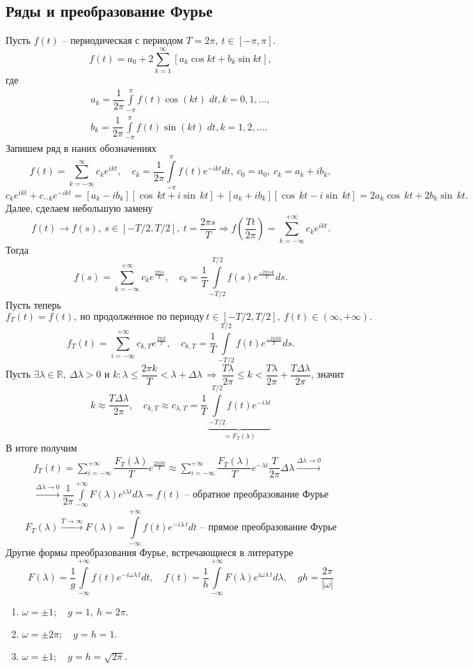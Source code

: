 \subsection{Ряды и преобразование Фурье}
Пусть $f(t)$ -- периодическая с периодом $T=2\pi,\: t\in[-\pi,\pi]$.
$$
f(t)=a_0+2\sum\limits_{k=1}^{\infty}\left[a_k \cos kt + b_k \sin kt\right],
$$
где 
$$
\begin{array}{ll}
a_k=\dfrac{1}{2\pi}\int\limits_{-\pi}^{\pi}f(t)\cos(kt)\;dt, k=0,1,\dots, \\
b_k=\dfrac{1}{2\pi}\int\limits_{-\pi}^{\pi}f(t)\sin(kt)\;dt, k=1,2,\dots.
\end{array}
$$
Запишем ряд в наних обозначениях
$$
f(t)=\sum\limits_{k=-\infty}^{\infty}c_ke^{ikt},\quad c_k=\dfrac{1}{2\pi}\int\limits_{-\pi}^{\pi}f(t)e^{-ikt}dt,\: c_0=a_0,\: c_k=a_k+ib_k,
$$
$$
c_k e^{ikt} + c_{-k} e^{-ikt}=[a_k-ib_k][\cos\,kt + i\sin\,kt] + [a_k+ib_k][\cos\,kt-i\sin\,kt]=2a_k\cos\,kt+2b_k\sin\,kt.
$$
Далее, сделаем небольшую замену
$$
f(t)\longrightarrow f(s),\ s\in[-T/2,T/2],\ t=\dfrac{2\pi s}{T}\Rightarrow f\left(\dfrac{Tt}{2\pi}\right)=\sum\limits_{k=-\infty}^{+\infty}c_k e^{ikt}.
$$
Тогда 
$$
f(s)=\sum\limits_{k=-\infty}^{+\infty}c_k e^{\frac{2\pi is}{T}},\quad c_k=\dfrac{1}{T}\int\limits_{-T/2}^{T/2}f(s)e^{\frac{-2\pi isk}{T}}ds.
$$
Пусть теперь
$$
f_T(t)=f(t),\ \text{но продолженное по периоду}\ t\in\left[-T/2,T/2\right],\ f(t)\in (\infty,+\infty).
$$
$$
f_T(t)=\sum\limits_{i=-\infty}^{+\infty}c_{k,T} e^{\frac{2\pi it}{T}},\quad c_{k,T}=\dfrac{1}{T}\int\limits_{-T/2}^{T/2}f(t)e^{\frac{-2\pi itk}{T}}ds.
$$
Пусть $\exists\lambda\in\mathbb{R},\ \Delta\lambda > 0$  и $k:\lambda\leqslant \dfrac{2\pi k}{T}<\lambda+\Delta\lambda\:\Rightarrow\:\dfrac{T\lambda}{2\pi}\leq k < \dfrac{T\lambda}{2\pi}+\dfrac{T\Delta\lambda}{2\pi}$,  значит 
$$
k\approx \dfrac{T\Delta\lambda}{2\pi},\quad c_{k,T}\approx c_{\lambda,T}=\dfrac{1}{T}\underbrace{\int\limits_{-T/2}^{T/2}f(t)e^{-i\lambda t}}_{=F_T(\lambda)}
$$
В итоге получим
\begin{multline*}
f_T(t)=\sum\limits_{i=-\infty}^{+\infty}\dfrac{F_T(\lambda)}{T}e^{\frac{2\pi ikt}{T}}
\approx\sum\limits_{i=-\infty}^{+\infty}\dfrac{F_T(\lambda)}{T}e^{-\lambda t}\dfrac{T}{2\pi}\Delta\lambda
\xrightarrow{\Delta\lambda\to 0}\\
\xrightarrow{\Delta\lambda\to 0}
\boxed{\dfrac{1}{2\pi}\int\limits_{-\infty}^{+\infty}F(\lambda)e^{i\lambda t}d\lambda=f(t)}\textbf{ -- обратное преобразование Фурье}
\end{multline*}
$$
\boxed{
F_T(\lambda)\xrightarrow{T\to\infty}F(\lambda)=\int\limits_{-\infty}^{+\infty}f(t)e^{-i\lambda\,t}dt}\textbf{ -- прямое преобразование Фурье}
$$
Другие формы преобразования Фурье, встречающиеся в литературе
$$
F(\lambda)=\dfrac{1}{g}\int\limits_{-\infty}^{+\infty}f(t)e^{-i\omega\lambda\,t}dt,\quad 
f(t)=\dfrac{1}{h}\int\limits_{-\infty}^{+\infty}F(\lambda)e^{i\omega\lambda\,t}d\lambda,\quad
gh=\dfrac{2\pi}{|\omega|}
$$
\begin{enumerate}
\item $\omega=\pm 1;\quad g=1,\ h=2\pi.$
\item $\omega=\pm 2\pi;\quad g=h=1.$ 
\item $\omega=\pm 1;\quad g=h=\sqrt{2\pi}.$ 
\end{enumerate}
